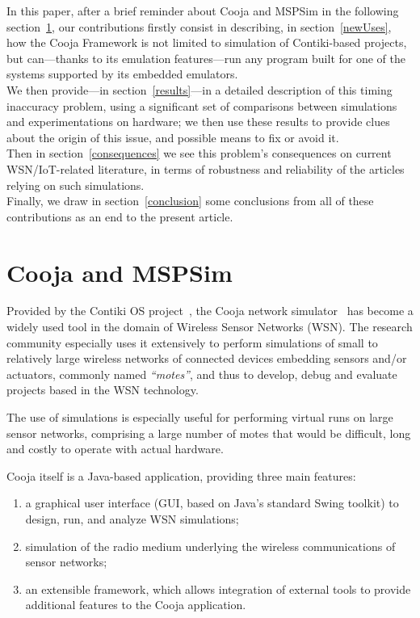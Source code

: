 \documentclass[10pt,emptycopyrightspace]{ewsn-proc}
\begin{document}
\medskip

In this paper, after a brief reminder about Cooja and MSPSim in the
following section~\ref{coojaMspsim}, our contributions firstly consist
in describing, in section~\ref{newUses}, how the Cooja Framework is not
limited to simulation of Contiki-based projects, but can---thanks to
its emulation features---run any program built for one of the systems
supported by its embedded emulators. \\
We then provide---in section~\ref{results}---in a detailed description
of this timing inaccuracy problem, using a significant set of comparisons
between simulations and experimentations on hardware; we then use
these results to provide clues about the origin of this issue, and
possible means to fix or avoid it. \\
Then in section~\ref{consequences} we see this problem's consequences
on current WSN/IoT-related literature, in terms of robustness and
reliability of the articles relying on such simulations. \\
Finally, we draw in section~\ref{conclusion} some conclusions from all
of these contributions as an end to the present article.

\medskip


\section{Cooja and MSPSim}
\label{coojaMspsim}

Provided by the Contiki OS project~\cite{ContikiOS}, the Cooja network
simulator~\cite{Cooja} has become a widely used tool in the domain of
Wireless Sensor Networks (WSN). The research community especially uses
it extensively to perform simulations of small to relatively large wireless
networks of connected devices embedding sensors and/or actuators, commonly
named \emph{``motes''}, and thus to develop, debug and evaluate projects
based in the WSN technology.

The use of simulations is especially useful for performing virtual runs
on large sensor networks, comprising a large number of motes that would
be difficult, long and costly to operate with actual hardware.

\medskip

Cooja itself is a Java-based application, providing three main features:
\begin{enumerate}
\item a graphical user interface (GUI, based on Java's standard Swing toolkit)
to design, run, and analyze WSN simulations;
\item simulation of the radio medium underlying the wireless communications
of sensor networks;
\item an extensible framework, which allows integration of external tools
to provide additional features to the Cooja application.
\end{enumerate}
\end{document}
